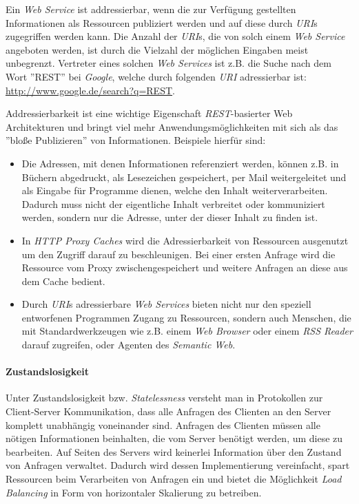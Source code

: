 Ein \textit{Web Service} ist addressierbar, wenn die zur Verfügung
gestellten Informationen als Ressourcen publiziert werden und auf
diese durch \textit{URI}s zugegriffen werden kann. Die Anzahl der
\textit{URI}s, die von solch einem \textit{Web Service} angeboten
werden, ist durch die Vielzahl der möglichen Eingaben meist
unbegrenzt.  Vertreter eines solchen \textit{Web Services} ist
z.B. die Suche nach dem Wort ''REST'' bei \textit{Google}, welche
durch folgenden \textit{URI} adressierbar ist:
\url{http://www.google.de/search?q=REST}.

Addressierbarkeit ist eine wichtige Eigenschaft
\textit{REST}-basierter Web Architekturen und bringt viel mehr
Anwendungsmöglichkeiten mit sich als das ''bloße Publizieren'' von
Informationen. Beispiele hierfür sind:

\begin{itemize}
\item Die Adressen, mit denen Informationen referenziert werden,
  können z.B. in Büchern abgedruckt, als Lesezeichen gespeichert, per
  Mail weitergeleitet und als Eingabe für Programme dienen, welche den
  Inhalt weiterverarbeiten. Dadurch muss nicht der eigentliche Inhalt
  verbreitet oder kommuniziert werden, sondern nur die Adresse, unter
  der dieser Inhalt zu finden ist.
\item In \textit{HTTP Proxy Caches} wird die Adressierbarkeit von
  Ressourcen ausgenutzt um den Zugriff darauf zu beschleunigen. Bei
  einer ersten Anfrage wird die Ressource vom Proxy
  zwischengespeichert und weitere Anfragen an diese aus dem Cache
  bedient.
\item Durch \textit{URI}s adressierbare \textit{Web Services} bieten
  nicht nur den speziell entworfenen Programmen Zugang zu Ressourcen,
  sondern auch Menschen, die mit Standardwerkzeugen wie z.B. einem
  \textit{Web Browser} oder einem \textit{RSS Reader} darauf
  zugreifen, oder Agenten des \textit{Semantic Web}.
\end{itemize}

\paragraph{Zustandslosigkeit}
Unter Zustandslosigkeit bzw. \textit{Statelessness} versteht man in
Protokollen zur Client-Server Kommunikation, dass alle Anfragen des
Clienten an den Server komplett unabhängig voneinander sind. Anfragen
des Clienten müssen alle nötigen Informationen beinhalten, die vom
Server benötigt werden, um diese zu bearbeiten. Auf Seiten des Servers
wird keinerlei Information über den Zustand von Anfragen
verwaltet. Dadurch wird dessen Implementierung vereinfacht, spart
Ressourcen beim Verarbeiten von Anfragen ein und bietet die
Möglichkeit \textit{Load Balancing} in Form von horizontaler
Skalierung zu betreiben.

